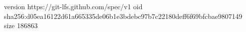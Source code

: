 version https://git-lfs.github.com/spec/v1
oid sha256:d05ea16122d61a665335de06b1e3bdebc97b7c22180deff6f69bfcbae9807149
size 186863
